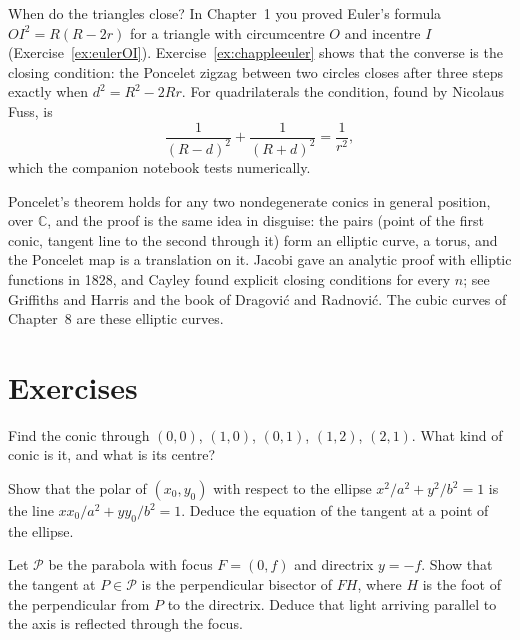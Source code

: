 When do the triangles close? In Chapter~1 you proved Euler's formula $OI^2=R(R-2r)$ for a triangle with circumcentre $O$ and incentre $I$
(Exercise~\ref{ex:eulerOI}). Exercise~\ref{ex:chappleeuler} shows that the converse is the closing condition: the Poncelet zigzag between two
circles closes after three steps exactly when $d^2=R^2-2Rr$. For quadrilaterals the condition, found by Nicolaus Fuss, is
\[
\frac1{(R-d)^2}+\frac1{(R+d)^2}=\frac1{r^2},
\]
which the companion notebook tests numerically.

\begin{remark}
Poncelet's theorem holds for any two nondegenerate conics in general position, over $\mathbb C$, and the proof is the same idea in disguise: the
pairs (point of the first conic, tangent line to the second through it) form an elliptic curve, a torus, and the Poncelet map is a translation on it.
Jacobi gave an analytic proof with elliptic functions in 1828, and Cayley found explicit closing conditions for every $n$; see Griffiths and Harris and
the book of Dragovi\'c and Radnovi\'c. The cubic curves of Chapter~8 are these elliptic curves.
\end{remark}

\section{Exercises}

\begin{exercise}[$\star$]\label{ex:fivepoints}
Find the conic through $(0,0)$, $(1,0)$, $(0,1)$, $(1,2)$, $(2,1)$. What kind of conic is it, and what is its centre?
\end{exercise}

\begin{exercise}[$\star$]\label{ex:tangentellipse}
Show that the polar of $(x_0,y_0)$ with respect to the ellipse $x^2/a^2+y^2/b^2=1$ is the line $xx_0/a^2+yy_0/b^2=1$. Deduce the equation of the
tangent at a point of the ellipse.
\end{exercise}

\begin{exercise}[$\star$]\label{ex:parabolareflect}
Let $\mathcal P$ be the parabola with focus $F=(0,f)$ and directrix $y=-f$. Show that the tangent at $P\in\mathcal P$ is the perpendicular bisector of
$FH$, where $H$ is the foot of the perpendicular from $P$ to the directrix. Deduce that light arriving parallel to the axis is reflected through the focus.
\end{exercise}


